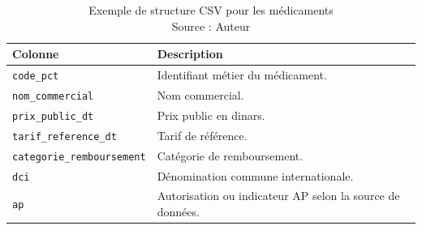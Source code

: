 \begin{table}[H]
    \centering
    \caption{Exemple de structure CSV pour les médicaments\\ \small Source : Auteur}
    \begin{tabular}{L{5.2cm}L{7.8cm}}
        \toprule
        \textbf{Colonne} & \textbf{Description} \\
        \midrule
        \texttt{code\_pct} & Identifiant métier du médicament. \\
        \texttt{nom\_commercial} & Nom commercial. \\
        \texttt{prix\_public\_dt} & Prix public en dinars. \\
        \texttt{tarif\_reference\_dt} & Tarif de référence. \\
        \texttt{categorie\_remboursement} & Catégorie de remboursement. \\
        \texttt{dci} & Dénomination commune internationale. \\
        \texttt{ap} & Autorisation ou indicateur AP selon la source de données. \\
        \bottomrule
    \end{tabular}
\end{table}
